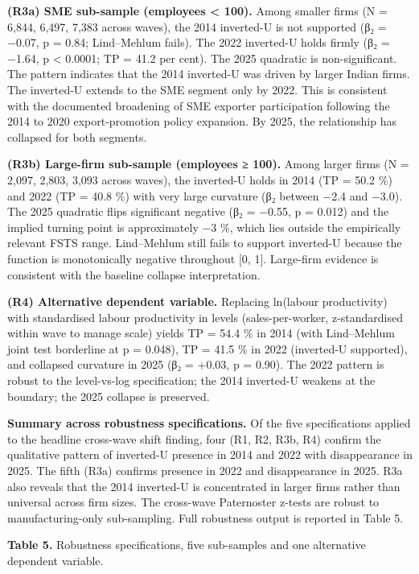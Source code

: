 \documentclass[
  12pt]{article}
\begin{document}
\textbf{(R3a) SME sub-sample (employees \textless{} 100).} Among smaller
firms (N = 6,844, 6,497, 7,383 across waves), the 2014 inverted-U is not
supported (β₂ = −0.07, p = 0.84; Lind--Mehlum fails). The 2022
inverted-U holds firmly (β₂ = −1.64, p \textless{} 0.0001; TP = 41.2 per
cent). The 2025 quadratic is non-significant. The pattern indicates that
the 2014 inverted-U was driven by larger Indian firms. The inverted-U
extends to the SME segment only by 2022. This is consistent with the
documented broadening of SME exporter participation following the 2014
to 2020 export-promotion policy expansion. By 2025, the relationship has
collapsed for both segments.

\textbf{(R3b) Large-firm sub-sample (employees ≥ 100).} Among larger
firms (N = 2,097, 2,803, 3,093 across waves), the inverted-U holds in
2014 (TP = 50.2 \%) and 2022 (TP = 40.8 \%) with very large curvature
(β₂ between −2.4 and −3.0). The 2025 quadratic flips significant
negative (β₂ = −0.55, p = 0.012) and the implied turning point is
approximately −3 \%, which lies outside the empirically relevant FSTS
range. Lind--Mehlum still fails to support inverted-U because the
function is monotonically negative throughout {[}0, 1{]}. Large-firm
evidence is consistent with the baseline collapse interpretation.

\textbf{(R4) Alternative dependent variable.} Replacing ln(labour
productivity) with standardised labour productivity in levels
(sales-per-worker, z-standardised within wave to manage scale) yields TP
= 54.4 \% in 2014 (with Lind--Mehlum joint test borderline at p =
0.048), TP = 41.5 \% in 2022 (inverted-U supported), and collapsed
curvature in 2025 (β₂ = +0.03, p = 0.90). The 2022 pattern is robust to
the level-vs-log specification; the 2014 inverted-U weakens at the
boundary; the 2025 collapse is preserved.

\textbf{Summary across robustness specifications.} Of the five
specifications applied to the headline cross-wave shift finding, four
(R1, R2, R3b, R4) confirm the qualitative pattern of inverted-U presence
in 2014 and 2022 with disappearance in 2025. The fifth (R3a) confirms
presence in 2022 and disappearance in 2025. R3a also reveals that the
2014 inverted-U is concentrated in larger firms rather than universal
across firm sizes. The cross-wave Paternoster z-tests are robust to
manufacturing-only sub-sampling. Full robustness output is reported in
Table 5.

\textbf{Table 5.} Robustness specifications, five sub-samples and one
alternative dependent variable.
\end{document}
